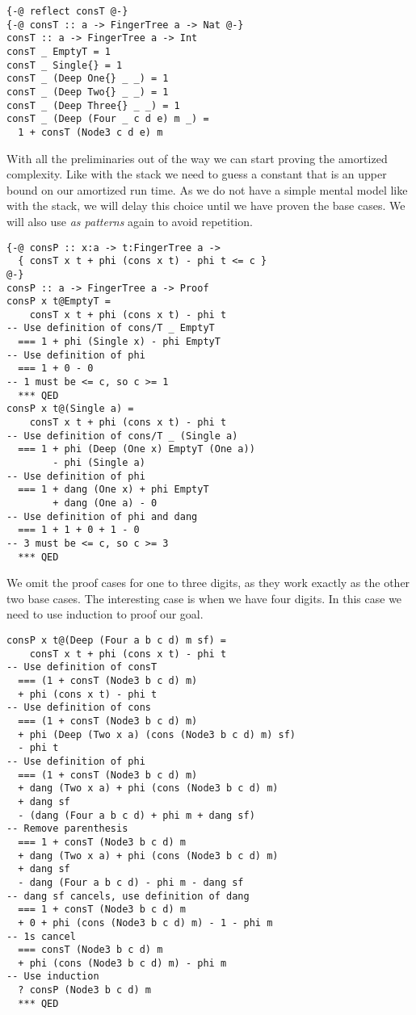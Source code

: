 \documentclass[sigplan,screen]{acmart}
\begin{document}
\begin{lstlisting}
{-@ reflect consT @-}
{-@ consT :: a -> FingerTree a -> Nat @-}
consT :: a -> FingerTree a -> Int
consT _ EmptyT = 1
consT _ Single{} = 1
consT _ (Deep One{} _ _) = 1
consT _ (Deep Two{} _ _) = 1
consT _ (Deep Three{} _ _) = 1
consT _ (Deep (Four _ c d e) m _) =
  1 + consT (Node3 c d e) m
\end{lstlisting}

With all the preliminaries out of the way we can start proving the amortized complexity. Like with the stack we need to guess a constant that is an upper bound on our amortized run time. As we do not have a simple mental model like with the stack, we will delay this choice until we have proven the base cases. We will also use \textit{as patterns} again to avoid repetition.

\begin{lstlisting}
{-@ consP :: x:a -> t:FingerTree a ->
  { consT x t + phi (cons x t) - phi t <= c }
@-}
consP :: a -> FingerTree a -> Proof
consP x t@EmptyT =
    consT x t + phi (cons x t) - phi t
-- Use definition of cons/T _ EmptyT
  === 1 + phi (Single x) - phi EmptyT
-- Use definition of phi
  === 1 + 0 - 0
-- 1 must be <= c, so c >= 1
  *** QED
consP x t@(Single a) =
    consT x t + phi (cons x t) - phi t
-- Use definition of cons/T _ (Single a)
  === 1 + phi (Deep (One x) EmptyT (One a))
        - phi (Single a)
-- Use definition of phi
  === 1 + dang (One x) + phi EmptyT
        + dang (One a) - 0
-- Use definition of phi and dang
  === 1 + 1 + 0 + 1 - 0
-- 3 must be <= c, so c >= 3
  *** QED
\end{lstlisting}

We omit the proof cases for one to three digits, as they work exactly as the other two base cases. The interesting case is when we have four digits. In this case we need to use induction to proof our goal.

\begin{lstlisting}
consP x t@(Deep (Four a b c d) m sf) =
    consT x t + phi (cons x t) - phi t
-- Use definition of consT
  === (1 + consT (Node3 b c d) m)
  + phi (cons x t) - phi t
-- Use definition of cons
  === (1 + consT (Node3 b c d) m)
  + phi (Deep (Two x a) (cons (Node3 b c d) m) sf)
  - phi t
-- Use definition of phi
  === (1 + consT (Node3 b c d) m)
  + dang (Two x a) + phi (cons (Node3 b c d) m)
  + dang sf
  - (dang (Four a b c d) + phi m + dang sf)
-- Remove parenthesis
  === 1 + consT (Node3 b c d) m
  + dang (Two x a) + phi (cons (Node3 b c d) m)
  + dang sf
  - dang (Four a b c d) - phi m - dang sf
-- dang sf cancels, use definition of dang
  === 1 + consT (Node3 b c d) m
  + 0 + phi (cons (Node3 b c d) m) - 1 - phi m
-- 1s cancel
  === consT (Node3 b c d) m
  + phi (cons (Node3 b c d) m) - phi m
-- Use induction
  ? consP (Node3 b c d) m
  *** QED
\end{lstlisting}
\end{document}
